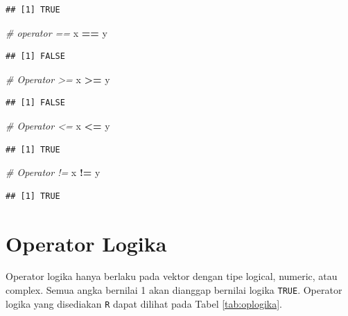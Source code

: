 \documentclass[
]{book}
\newenvironment{Shaded}{\begin{snugshade}}{\end{snugshade}}
\newcommand{\CommentTok}[1]{\textcolor[rgb]{0.56,0.35,0.01}{\textit{#1}}}
\newcommand{\NormalTok}[1]{#1}
\newcommand{\SpecialCharTok}[1]{\textcolor[rgb]{0.81,0.36,0.00}{\textbf{#1}}}
\theoremstyle{definition}
\theoremstyle{definition}
\theoremstyle{definition}
\theoremstyle{definition}
\theoremstyle{remark}
\begin{document}
\begin{verbatim}
## [1] TRUE
\end{verbatim}

\begin{Shaded}
\begin{Highlighting}[]
\CommentTok{\# operator ==}
\NormalTok{x }\SpecialCharTok{==}\NormalTok{ y}
\end{Highlighting}
\end{Shaded}

\begin{verbatim}
## [1] FALSE
\end{verbatim}

\begin{Shaded}
\begin{Highlighting}[]
\CommentTok{\# Operator \textgreater{}=}
\NormalTok{x }\SpecialCharTok{\textgreater{}=}\NormalTok{ y}
\end{Highlighting}
\end{Shaded}

\begin{verbatim}
## [1] FALSE
\end{verbatim}

\begin{Shaded}
\begin{Highlighting}[]
\CommentTok{\# Operator \textless{}=}
\NormalTok{x }\SpecialCharTok{\textless{}=}\NormalTok{ y}
\end{Highlighting}
\end{Shaded}

\begin{verbatim}
## [1] TRUE
\end{verbatim}

\begin{Shaded}
\begin{Highlighting}[]
\CommentTok{\# Operator !=}
\NormalTok{x }\SpecialCharTok{!=}\NormalTok{ y}
\end{Highlighting}
\end{Shaded}

\begin{verbatim}
## [1] TRUE
\end{verbatim}

\hypertarget{logicoperators}{%
\section{Operator Logika}\label{logicoperators}}

Operator logika hanya berlaku pada vektor dengan tipe logical, numeric, atau complex. Semua angka bernilai 1 akan dianggap bernilai logika \texttt{TRUE}. Operator logika yang disediakan \texttt{R} dapat dilihat pada Tabel \ref{tab:oplogika}.
\end{document}
